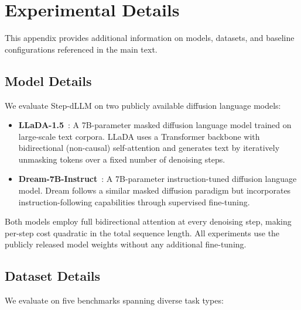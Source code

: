 \documentclass{article}
\theoremstyle{plain}
\theoremstyle{definition}
\theoremstyle{remark}
\begin{document}



\appendix
\section{Experimental Details}
\label{app:details}

This appendix provides additional information on models, datasets, and baseline configurations referenced in the main text.

\subsection{Model Details}
\label{app:models}

We evaluate Step-dLLM on two publicly available diffusion language models:

\begin{itemize}
    \item \textbf{LLaDA-1.5}~\citep{nie2025llada}: A 7B-parameter masked diffusion language model trained on large-scale text corpora. LLaDA uses a Transformer backbone with bidirectional (non-causal) self-attention and generates text by iteratively unmasking tokens over a fixed number of denoising steps.
    \item \textbf{Dream-7B-Instruct}~\citep{ye2025dream}: A 7B-parameter instruction-tuned diffusion language model. Dream follows a similar masked diffusion paradigm but incorporates instruction-following capabilities through supervised fine-tuning.
\end{itemize}

Both models employ full bidirectional attention at every denoising step, making per-step cost quadratic in the total sequence length. All experiments use the publicly released model weights without any additional fine-tuning.

\subsection{Dataset Details}
\label{app:datasets}

We evaluate on five benchmarks spanning diverse task types:
\end{document}
